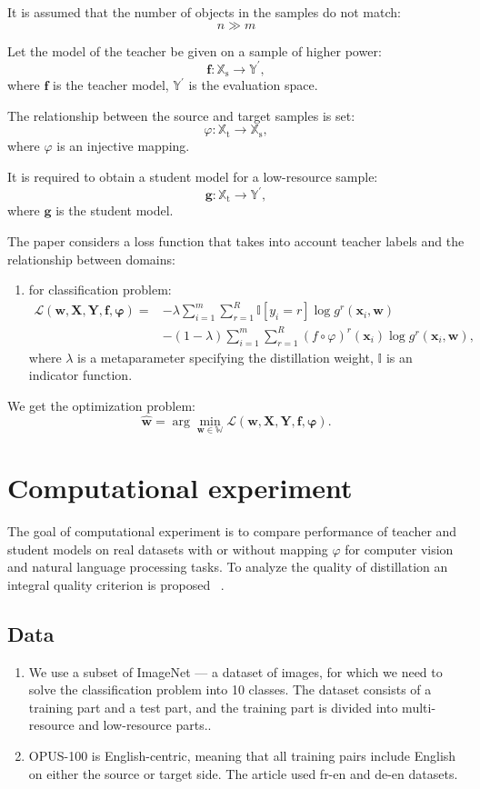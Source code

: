 \documentclass[12pt]{article}
\begin{document}
It is assumed that the number of objects in the samples do not match:
$$n \gg m$$

Let the model of the teacher be given on a sample of higher power:
$$\mathbf{f}: \mathbb{X}_{\text{s}} \rightarrow \mathbb{Y}^{\prime},$$
where $\mathbf{f}$ is the teacher model, $\mathbb{Y}^{\prime}$ is the evaluation space.

The relationship between the source and target samples is set:
$$\varphi: \mathbb{X}_{\text{t}} \rightarrow \mathbb{X}_{\text{s}},$$
where $\varphi$ is an injective mapping. 

It is required to obtain a student model for a low-resource sample:
$$\mathbf{g}: \mathbb{X}_{\text{t}} \rightarrow \mathbb{Y}^{\prime},$$
where $\mathbf{g}$ is the student model.

The paper considers a loss function that takes into account teacher labels and the relationship between domains:
\begin{enumerate}
     \item for classification problem:
     \[
     \begin{aligned}
     \mathcal{L}(\mathbf{w,X,Y,f,\varphi})=&-\lambda\sum\limits_{i=1}^{m}\sum\limits_{r=1}^{ R}\mathbb{I}[y_{i}=r]\log{g^{r}(\mathbf{x}_{i},\mathbf{w})}\\
     &-(1-\lambda)\sum\limits_{i=1}^{m}\sum\limits_{r=1}^{R}(f\circ \varphi)^{r}(\mathbf{x }_{i})\log{g^{r}(\mathbf{x}_{i},\mathbf{w})},
     \end{aligned}
     \]
     where $\lambda$ is a metaparameter specifying the distillation weight, $\mathbb{I}$ is an indicator function.
\end{enumerate}

We get the optimization problem:
$$\hat{\mathbf{w}} = \arg\min_{\mathbf{w} \in \mathbb{W}} \mathcal{L}(\mathbf{w,X,Y,f,\varphi} ).$$

\section{Computational experiment}
The goal of computational experiment is to compare performance of teacher and student models on real datasets with or without mapping $\varphi$ for computer vision and natural language processing tasks. To analyze the quality of distillation an integral quality criterion is proposed ~\cite{Grabovoy2022}.
\subsection{Data}
\begin{enumerate}
    \item We use a subset of ImageNet --- a dataset of images, for which we need to solve the classification problem into 10 classes. The dataset consists of a training part and a test part, and the training part is divided into multi-resource and low-resource parts.\citep{IMAGENET}.
    \item OPUS-100 is English-centric, meaning that all training pairs include English on either the source or target side. The article used fr-en and de-en datasets. \citep{OPUS100}
\end{enumerate}
\end{document}
